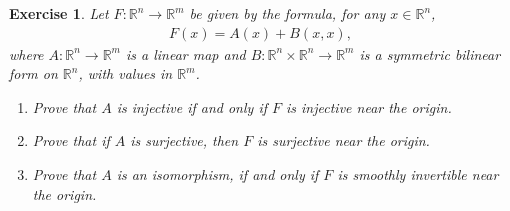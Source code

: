 \documentclass[11pt]{article}
\newtheorem{exercise}{Exercise}[section]
\theoremstyle{definition}
\numberwithin{equation}{subsection}
\begin{document}
\medskip

\begin{exercise}{\rm *}
Let $F: \mathbb{R}^n \to \mathbb{R}^m$ be given by the formula, for any $x \in \mathbb{R}^n$,
\begin{align*}
    F(x) = A(x) + B(x,x),
\end{align*}
where $A: \mathbb{R}^n \to \mathbb{R}^m$ is a linear map and $B: \mathbb{R}^n \times \mathbb{R}^n \to \mathbb{R}^m$ is a symmetric bilinear form on $\mathbb{R}^n$, with values in $\mathbb{R}^m$.
\begin{enumerate}[label=(\alph*)]
    \item Prove that $A$ is injective if and only if $F$ is injective near the origin.
    
    \item Prove that if $A$ is surjective, then $F$ is surjective near the origin.
    
    \item Prove that $A$ is an isomorphism, if and only if $F$ is smoothly invertible near the origin.
\end{enumerate}
\end{exercise}
\end{document}
